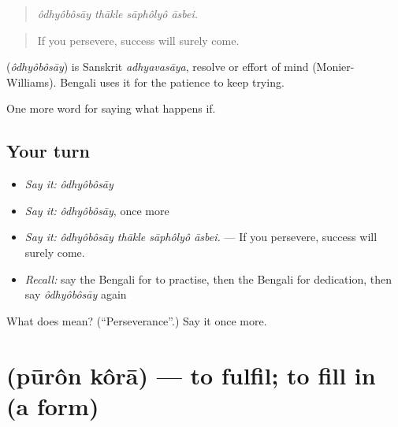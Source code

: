 \begin{quote}
   
\end{quote}

\begin{quote}
\emph{ôdhyôbôsāy thākle sāphôlyô āsbei.}
\end{quote}

\begin{quote}
If you persevere, success will surely come.
\end{quote}

\begin{cousinweb}
\textbf{} (\emph{ôdhyôbôsāy}) is Sanskrit \emph{adhyavasāya}, resolve or effort of mind (Monier-Williams). Bengali uses it for the patience to keep trying.
\end{cousinweb}

\begin{grammarlens}[title={What you've built}]
One more word for saying what happens if.
\end{grammarlens}

\subsection*{Your turn}
\begin{itemize}
\raggedright
  \item \emph{Say it:} \emph{ôdhyôbôsāy}
  \item \emph{Say it:} \emph{ôdhyôbôsāy}, once more
  \item \emph{Say it:} \emph{ôdhyôbôsāy thākle sāphôlyô āsbei.} — If you persevere, success will surely come.
  \item \emph{Recall:} say the Bengali for to practise, then the Bengali for dedication, then say \emph{ôdhyôbôsāy} again
\end{itemize}

\begin{tcolorbox}[breakable,colback=teal!4,colframe=teal!35!black,title={Before you move on}]
What does  mean? (\textquotedblleft{}Perseverance\textquotedblright{}.) Say it once more.
\end{tcolorbox}
\section[\texorpdfstring{\bn{পূরণ} \bn{করা} (pūrôn kôrā)}{পূরণ করা (pūrôn kôrā)}]{  (pūrôn kôrā) — to fulfil; to fill in (a form)}

